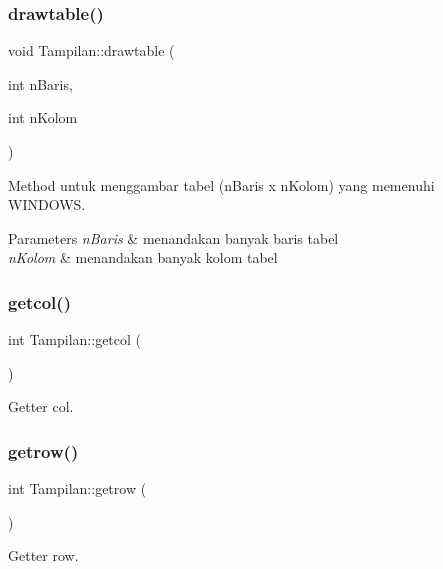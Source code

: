 \subsubsection{\texorpdfstring{drawtable()}{drawtable()}}
{\footnotesize\ttfamily void Tampilan\+::drawtable (\begin{DoxyParamCaption}\item[{int}]{n\+Baris,  }\item[{int}]{n\+Kolom }\end{DoxyParamCaption})}



Method untuk menggambar tabel (n\+Baris x n\+Kolom) yang memenuhi W\+I\+N\+D\+O\+WS. 


\begin{DoxyParams}{Parameters}
{\em n\+Baris} & menandakan banyak baris tabel \\
\hline
{\em n\+Kolom} & menandakan banyak kolom tabel \\
\hline
\end{DoxyParams}
\mbox{\label{classTampilan_af1cad6ddd09a36776855f198e3ec069e}} 
\subsubsection{\texorpdfstring{getcol()}{getcol()}}
{\footnotesize\ttfamily int Tampilan\+::getcol (\begin{DoxyParamCaption}{ }\end{DoxyParamCaption})}



Getter col. 

\mbox{\label{classTampilan_a4adf565e9d2634938d9790fe8caca1b6}} 
\subsubsection{\texorpdfstring{getrow()}{getrow()}}
{\footnotesize\ttfamily int Tampilan\+::getrow (\begin{DoxyParamCaption}{ }\end{DoxyParamCaption})}



Getter row. 

\mbox{\label{classTampilan_ab78540f8a9cb938def2b49628fd2968a}} 

